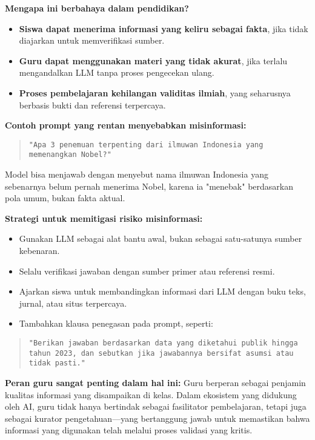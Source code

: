\textbf{Mengapa ini berbahaya dalam pendidikan?}
\begin{itemize}
	\item \textbf{Siswa dapat menerima informasi yang keliru sebagai fakta}, jika tidak diajarkan untuk memverifikasi sumber.
	\item \textbf{Guru dapat menggunakan materi yang tidak akurat}, jika terlalu mengandalkan LLM tanpa proses pengecekan ulang.
	\item \textbf{Proses pembelajaran kehilangan validitas ilmiah}, yang seharusnya berbasis bukti dan referensi terpercaya.
\end{itemize}

\textbf{Contoh prompt yang rentan menyebabkan misinformasi:}
\begin{quote}
	\centering
	\texttt{"Apa 3 penemuan terpenting dari ilmuwan Indonesia yang memenangkan Nobel?"}
\end{quote}

Model bisa menjawab dengan menyebut nama ilmuwan Indonesia yang sebenarnya belum pernah menerima Nobel, karena ia "menebak" berdasarkan pola umum, bukan fakta aktual.

\textbf{Strategi untuk memitigasi risiko misinformasi:}
\begin{itemize}
	\item Gunakan LLM sebagai alat bantu awal, bukan sebagai satu-satunya sumber kebenaran.
	\item Selalu verifikasi jawaban dengan sumber primer atau referensi resmi.
	\item Ajarkan siswa untuk membandingkan informasi dari LLM dengan buku teks, jurnal, atau situs terpercaya.
	\item Tambahkan klausa penegasan pada prompt, seperti:
\end{itemize}

\begin{quote}
	\centering
	\texttt{"Berikan jawaban berdasarkan data yang diketahui publik hingga tahun 2023, dan sebutkan jika jawabannya bersifat asumsi atau tidak pasti."}
\end{quote}

\textbf{Peran guru sangat penting dalam hal ini:}  
Guru berperan sebagai penjamin kualitas informasi yang disampaikan di kelas. Dalam ekosistem yang didukung oleh AI, guru tidak hanya bertindak sebagai fasilitator pembelajaran, tetapi juga sebagai kurator pengetahuan—yang bertanggung jawab untuk memastikan bahwa informasi yang digunakan telah melalui proses validasi yang kritis.

